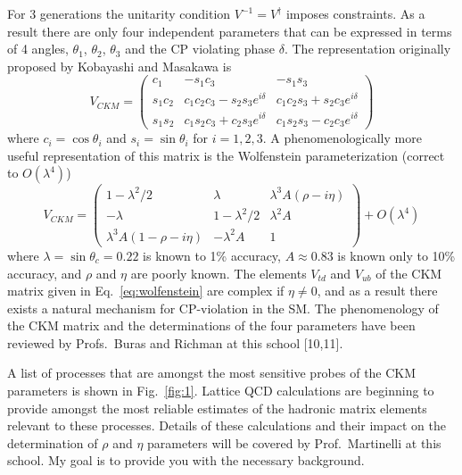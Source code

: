 For 3 generations the unitarity condition $V^{-1} = V^\dagger$ imposes
constraints. As a result there are only four independent parameters that
can be expressed in terms of 4 angles, $\theta_1$, $\theta_2$, $\theta_3$
and the CP violating phase $\delta$. The representation originally proposed
by Kobayashi and Masakawa is
\begin{equation}
V_{CKM} =
\begin{pmatrix}
c_1 & -s_1 c_3 & -s_1 s_3 \\
s_1 c_2 & c_1 c_2 c_3 - s_2 s_3 e^{i\delta} & c_1 c_2 s_3 + s_2 c_3 e^{i\delta} \\
s_1 s_2 & c_1 s_2 c_3 + c_2 s_3 e^{i\delta} & c_1 s_2 s_3 - c_2 c_3 e^{i\delta}
\end{pmatrix}
\label{eq:km}
\end{equation}
where $c_i = \cos\theta_i$ and $s_i = \sin\theta_i$ for $i = 1, 2, 3$. A
phenomenologically more useful representation of this matrix is the
Wolfenstein parameterization (correct to $O(\lambda^4)$)
\begin{equation}
V_{CKM} =
\begin{pmatrix}
1 - \lambda^2/2 & \lambda & \lambda^3 A (\rho - i\eta) \\
-\lambda & 1 - \lambda^2/2 & \lambda^2 A \\
\lambda^3 A (1 - \rho - i\eta) & -\lambda^2 A & 1
\end{pmatrix}
+ O(\lambda^4)
\label{eq:wolfenstein}
\end{equation}
where $\lambda = \sin\theta_c = 0.22$ is known to 1\% accuracy, $A \approx
0.83$ is known only to 10\% accuracy, and $\rho$ and $\eta$ are poorly
known. The elements $V_{td}$ and $V_{ub}$ of the CKM matrix given in
Eq.~\eqref{eq:wolfenstein} are complex if $\eta \neq 0$, and as a result
there exists a natural mechanism for CP-violation in the SM. The
phenomenology of the CKM matrix and the determinations of the four
parameters have been reviewed by Profs.~Buras and Richman at this school
[10,11].

A list of processes that are amongst the most sensitive probes of the CKM
parameters is shown in Fig.~\ref{fig:1}. Lattice QCD calculations are
beginning to provide amongst the most reliable estimates of the hadronic
matrix elements relevant to these processes. Details of these calculations
and their impact on the determination of $\rho$ and $\eta$ parameters will
be covered by Prof.~Martinelli at this school. My goal is to provide you
with the necessary background.
